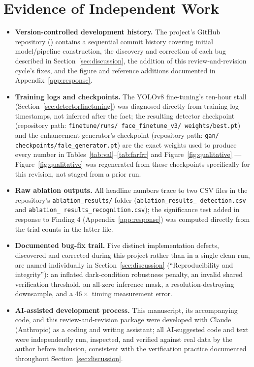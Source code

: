 \documentclass[conference]{IEEEtran}
\begin{document}
\section{Evidence of Independent Work}
\label{app:evidence}
\begin{itemize}[leftmargin=*]
\item \textbf{Version-controlled development history.} The
project's GitHub repository (\cite{labsecurity}) contains a
sequential commit history covering initial model/pipeline
construction, the discovery and correction of each bug described in
Section~\ref{sec:discussion}, the addition of this review-and-revision
cycle's fixes, and the figure and reference additions documented in
Appendix~\ref{app:response}.
\item \textbf{Training logs and checkpoints.} The YOLOv8
fine-tuning's ten-hour stall (Section~\ref{sec:detectorfinetuning})
was diagnosed directly from training-log timestamps, not inferred
after the fact; the resulting detector checkpoint (repository
path: \texttt{finetune/\allowbreak runs/\allowbreak
face\_\allowbreak finetune\_\allowbreak v3/\allowbreak
weights/\allowbreak best.pt}) and the enhancement generator's
checkpoint (repository path: \texttt{gan/\allowbreak
checkpoints/\allowbreak fale\_\allowbreak generator.pt}) are the
exact weights used to produce every number in
Tables~\ref{tab:val}--\ref{tab:farfrr} and
Figure~\ref{fig:qualitative} --- Figure~\ref{fig:qualitative} was
regenerated from these checkpoints specifically for this revision,
not staged from a prior run.
\item \textbf{Raw ablation outputs.} All headline numbers trace to
two CSV files in the repository's \texttt{ablation\_results/}
folder (\texttt{ablation\_\allowbreak results\_\allowbreak
detection.csv} and \texttt{ablation\_\allowbreak
results\_\allowbreak recognition.csv}); the significance test
added in response to Finding 4 (Appendix~\ref{app:response}) was
computed directly from the trial counts in the latter file.
\item \textbf{Documented bug-fix trail.} Five distinct
implementation defects, discovered and corrected during this
project rather than in a single clean run, are named individually
in Section~\ref{sec:discussion} (``Reproducibility and
integrity''): an inflated dark-condition robustness penalty, an
invalid shared verification threshold, an all-zero inference mask,
a resolution-destroying downsample, and a $46\times$ timing
measurement error.
\item \textbf{AI-assisted development process.} This manuscript,
its accompanying code, and this review-and-revision package were
developed with Claude (Anthropic) as a coding and writing
assistant; all AI-suggested code and text were independently run,
inspected, and verified against real data by the author before
inclusion, consistent with the verification practice documented
throughout Section~\ref{sec:discussion}.
\end{itemize}
\end{document}
